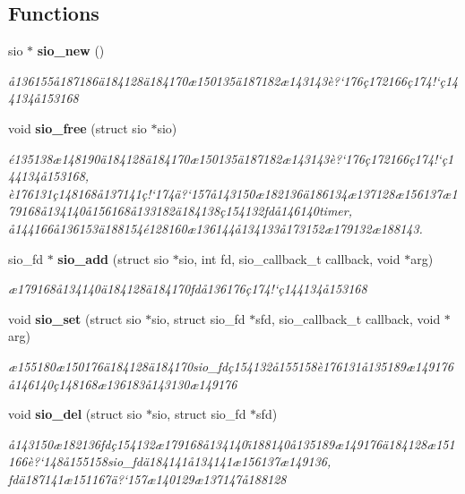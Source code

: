 \subsection*{Functions}
\begin{CompactItemize}
\item 
sio $\ast$ {\bf sio\_\-new} ()
\begin{CompactList}\small\item\em \aa{}136155\aa{}187186\"{a}184128\"{a}184170\ae{}150135\"{a}187182\ae{}143143\`{e}?`176\c{c}172166\c{c}174!`\c{c}144134\aa{}153168 \item\end{CompactList}\item 
void {\bf sio\_\-free} (struct sio $\ast$sio)
\begin{CompactList}\small\item\em \'{e}135138\ae{}148190\"{a}184128\"{a}184170\ae{}150135\"{a}187182\ae{}143143\`{e}?`176\c{c}172166\c{c}174!`\c{c}144134\aa{}153168, \`{e}176131\c{c}148168\aa{}137141\c{c}!`174\"{a}?`157\aa{}143150\ae{}182136\"{a}186134\ae{}137128\ae{}156137\ae{}179168\aa{}134140\aa{}156168\aa{}133182\"{a}184138\c{c}154132fd\aa{}146140timer, \aa{}144166\aa{}136153\"{a}188154\'{e}128160\ae{}136144\aa{}134133\aa{}173152\ae{}179132\ae{}188143. \item\end{CompactList}\item 
sio\_\-fd $\ast$ {\bf sio\_\-add} (struct sio $\ast$sio, int fd, sio\_\-callback\_\-t callback, void $\ast$arg)
\begin{CompactList}\small\item\em \ae{}179168\aa{}134140\"{a}184128\"{a}184170fd\aa{}136176\c{c}174!`\c{c}144134\aa{}153168 \item\end{CompactList}\item 
void {\bf sio\_\-set} (struct sio $\ast$sio, struct sio\_\-fd $\ast$sfd, sio\_\-callback\_\-t callback, void $\ast$arg)
\begin{CompactList}\small\item\em \ae{}155180\ae{}150176\"{a}184128\"{a}184170sio\_\-fd\c{c}154132\aa{}155158\`{e}176131\aa{}135189\ae{}149176\aa{}146140\c{c}148168\ae{}136183\aa{}143130\ae{}149176 \item\end{CompactList}\item 
void {\bf sio\_\-del} (struct sio $\ast$sio, struct sio\_\-fd $\ast$sfd)
\begin{CompactList}\small\item\em \aa{}143150\ae{}182136fd\c{c}154132\ae{}179168\aa{}134140\"{\i}188140\aa{}135189\ae{}149176\"{a}184128\ae{}151166\`{e}?`148\aa{}155158sio\_\-fd\"{a}184141\aa{}134141\ae{}156137\ae{}149136, fd\"{a}187141\ae{}151167\"{a}?`157\ae{}140129\ae{}137147\aa{}188128 \item\end{CompactList}\item 

\end{CompactItemize}
